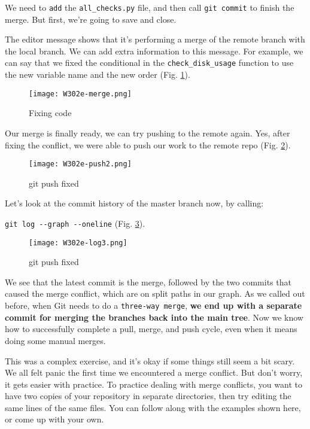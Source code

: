 	We need to \verb|add| the \verb|all_checks.py| file, and then call \verb|git commit| to finish the merge. But first, we're going to save and close.
	
	The editor message shows that it's performing a merge of the remote branch with the local branch. We can add extra information to this message. For example, we can say that we fixed the conditional in the \verb|check_disk_usage| function to use the new variable name and the new order (Fig. \ref{W302e-merge}).
	
	\begin{figure} 
		\caption{Fixing code}
		\centering
		\texttt{[image: W302e-merge.png]}
		\label{W302e-merge}
	\end{figure}
	
	Our merge is finally ready, we can try pushing to the remote again. Yes, after fixing the conflict, we were able to push our work to the remote repo (Fig. \ref{W302e-push2}). 
	
	\begin{figure} 
		\caption{git push fixed}
		\centering
		\texttt{[image: W302e-push2.png]}
		\label{W302e-push2}
	\end{figure}
	
	Let's look at the commit history of the master branch now, by calling:
	
	\verb|git log --graph --oneline| (Fig. \ref{W302e-log3}).
	
	\begin{figure} 
		\caption{git push fixed}
		\centering
		\texttt{[image: W302e-log3.png]}
		\label{W302e-log3}
	\end{figure}
	
	We see that the latest commit is the merge, followed by the two commits that caused the merge conflict, which are on split paths in our graph. As we called out before, when Git needs to do a \verb|three-way merge|, \textbf{we end up with a separate commit for merging the branches back into the main tree}. Now we know how to successfully complete a pull, merge, and push cycle, even when it means doing some manual merges. 
	
	This was a complex exercise, and it's okay if some things still seem a bit scary. We all felt panic the first time we encountered a merge conflict. But don't worry, it gets easier with practice. To practice dealing with merge conflicts, you want to have two copies of your repository in separate directories, then try editing the same lines of the same files. You can follow along with the examples shown here, or come up with your own.
	
